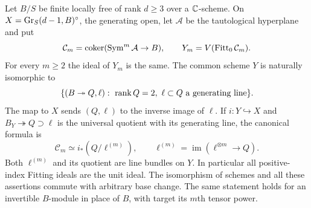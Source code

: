 \begin{theorem}\label{thm:universal-hyperplane}
Let $B/S$ be finite locally free of rank $d\ge3$ over a
$\mathbb C$-scheme. On $X=\operatorname{Gr}_S(d-1,B)^\circ$, the generating open,
let $\mathcal A$ be the tautological hyperplane and put
\[
 \mathcal C_m=\operatorname{coker}(\operatorname{Sym}^m\mathcal A\to B),
 \qquad Y_m=V(\operatorname{Fitt}_0\mathcal C_m).
\]
For every $m\ge2$ the ideal of $Y_m$ is the same. The common scheme
$Y$ is naturally isomorphic to
\begin{equation}\label{eq:universal-hyperplane-incidence}
 \{(B\twoheadrightarrow Q,\ell):\ \operatorname{rank} Q=2,
                 \ \ell\subset Q\text{ a generating line}\}.
\end{equation}
The map to $X$ sends $(Q,\ell)$ to the inverse image of $\ell$.
If $i:Y\hookrightarrow X$ and $B_Y\twoheadrightarrow Q\supset\ell$
is the universal quotient with its generating line, the canonical formula is
\begin{equation}\label{eq:hyperplane-canonical-line}
 \mathcal C_m\simeq i_*(Q/\ell^{(m)}),\qquad
 \ell^{(m)}=\operatorname{im}(\ell^{\otimes m}\longrightarrow Q).
\end{equation}
Both $\ell^{(m)}$ and its quotient are line bundles on $Y$.
In particular all positive-index Fitting ideals are the unit ideal. The isomorphism of schemes and all these assertions commute
with arbitrary base change. The same statement holds for an
invertible $B$-module in place of $B$, with target its $m$th tensor
power.
\end{theorem}
